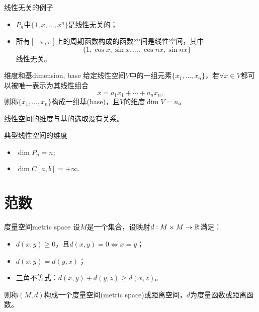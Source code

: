 \begin{example}
    {线性无关的例子}{}
    \begin{itemize}
        \item $P_n$中$\{1,x,\ldots,x^n\}$是线性无关的；
        \item 所有$[-\pi,\pi]$上的周期函数构成的函数空间是线性空间，其中
        \[
            \{1,\cos x,\sin x,\ldots,\cos nx,\sin nx\} 
        \]
        线性无关。
    \end{itemize}
\end{example}

\begin{definition}
    {维度和基}{dimension, base}
    给定线性空间$V$中的一组元素$\{x_1,\ldots,x_n\}$，若$\forall x\in V$都可以被唯一表示为其线性组合
    \begin{equation}
        x=a_1x_1+\cdots+a_nx_n,
    \end{equation}
    则称$\{x_1,\ldots,x_n\}$构成一组基(base)，且$V$的维度$\dim V=n$。
\end{definition}

\begin{theorem}
    {}{}
    线性空间的维度与基的选取没有关系。
\end{theorem}

\begin{example}
    {典型线性空间的维度}{}
    \begin{itemize}
        \item $\dim P_n=n;$
        \item $\dim C[a,b]=+\infty.$
    \end{itemize}
\end{example}

\section{范数}
\label{sec:norm}

\begin{definition}
    {度量空间}{metric space}
    设$M$是一个集合，设映射$d:M\times M\to\mathbb R$满足：
    \begin{itemize}
        \item $d(x,y)\geq 0$，且$d(x,y)=0\iff x=y$；
        \item $d(x,y)=d(y,x)$；
        \item 三角不等式：$d(x,y)+d(y,z)\geq d(x,z)$。
    \end{itemize}
    则称$(M,d)$构成一个度量空间(metric space)或距离空间，$d$为度量函数或距离函数。
\end{definition}

